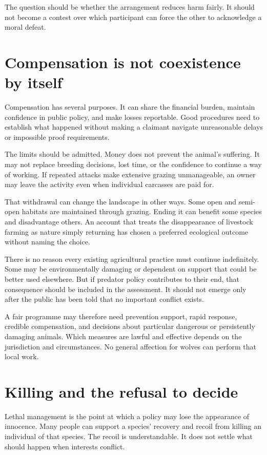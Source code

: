 \documentclass[12pt,a4paper]{book}
\begin{document}
The question should be whether the arrangement reduces harm fairly. It should not become a contest over which participant can force the other to acknowledge a moral defeat.

\section*{Compensation is not coexistence by itself}

Compensation has several purposes. It can share the financial burden, maintain confidence in public policy, and make losses reportable. Good procedures need to establish what happened without making a claimant navigate unreasonable delays or impossible proof requirements.

The limits should be admitted. Money does not prevent the animal's suffering. It may not replace breeding decisions, lost time, or the confidence to continue a way of working. If repeated attacks make extensive grazing unmanageable, an owner may leave the activity even when individual carcasses are paid for.

That withdrawal can change the landscape in other ways. Some open and semi-open habitats are maintained through grazing. Ending it can benefit some species and disadvantage others. An account that treats the disappearance of livestock farming as nature simply returning has chosen a preferred ecological outcome without naming the choice.

There is no reason every existing agricultural practice must continue indefinitely. Some may be environmentally damaging or dependent on support that could be better used elsewhere. But if predator policy contributes to their end, that consequence should be included in the assessment. It should not emerge only after the public has been told that no important conflict exists.

A fair programme may therefore need prevention support, rapid response, credible compensation, and decisions about particular dangerous or persistently damaging animals. Which measures are lawful and effective depends on the jurisdiction and circumstances. No general affection for wolves can perform that local work.

\section*{Killing and the refusal to decide}

Lethal management is the point at which a policy may lose the appearance of innocence. Many people can support a species' recovery and recoil from killing an individual of that species. The recoil is understandable. It does not settle what should happen when interests conflict.
\end{document}
